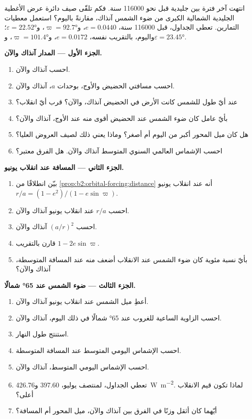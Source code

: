 \begin{problem}\label{pb:b2:orbital-forcing:1}
انتهت آخر فترة بين جليدية قبل نحو \num{116000} سنة. فكم تلقّى صيف دائرة
عرض الأغطية الجليدية الشمالية الكبرى من ضوء الشمس آنذاك، مقارنةً باليوم؟ استعمل معطيات
التمارين. تعطي الجداول، قبل \num{116000} سنة، $e = 0.0440$، و$\varpi = \ang{92.7}$،
و$\varepsilon = \ang{22.52}$؛ واليوم، بالتقريب نفسه، $e = 0.0172$، و$\varpi = \ang{101.4}$،
و$\varepsilon = \ang{23.45}$.

\medskip\noindent\textbf{الجزء الأول --- المدار آنذاك والآن.}
\begin{enumerate}
  \item احسب  آنذاك والآن.
  \item احسب مسافتي الحضيض والأوج، بوحدات $a$، آنذاك والآن.
  \item عند أيّ طول للشمس كانت الأرض في الحضيض آنذاك، والآن؟ قرب أيّ انقلاب؟
  \item بأيّ عامل كان ضوء الشمس عند الحضيض أقوى منه عند الأوج، آنذاك والآن؟
  \item هل كان ميل المحور أكبر من اليوم أم أصغر؟ وماذا يعني ذلك لصيف
        العروض العليا؟
  \item احسب الإشماس العالمي السنوي المتوسط آنذاك والآن. هل الفرق معتبر؟
\end{enumerate}

\medskip\noindent\textbf{الجزء الثاني --- المسافة عند انقلاب يونيو.}
\begin{enumerate}[resume]
  \item بيّن انطلاقًا من \cref{prop:b2:orbital-forcing:distance} أنه عند انقلاب يونيو $r/a = (1 -
        e^2)/(1 - e\sin\varpi)$.
  \item احسب $r/a$ عند انقلاب يونيو آنذاك والآن.
  \item احسب $(a/r)^2$ آنذاك والآن.
  \item قارن بالتقريب $1 - 2e\sin\varpi$.
  \item بأيّ نسبة مئوية كان ضوء الشمس عند الانقلاب أضعف منه عند المسافة المتوسطة، آنذاك والآن؟
\end{enumerate}

\medskip\noindent\textbf{الجزء الثالث --- ضوء الشمس عند \ang{65} شمالًا.}
\begin{enumerate}[resume]
  \item أعطِ ميل الشمس عند انقلاب يونيو آنذاك والآن.
  \item احسب الزاوية الساعية للغروب عند \ang{65} شمالًا في ذلك اليوم، آنذاك والآن.
  \item استنتج طول النهار.
  \item احسب الإشماس اليومي المتوسط عند المسافة المتوسطة.
  \item احسب الإشماس اليومي المتوسط، آنذاك والآن.
  \item تعطي الجداول، لمنتصف يوليو، 397.60 و\qty{426.76}{W.m^{-2}}. لماذا تكون قيم
        الانقلاب أعلى؟
  \item أيّهما كان أثقل وزنًا في الفرق بين آنذاك والآن، ميل المحور أم المسافة؟
\end{enumerate}


\end{problem}
